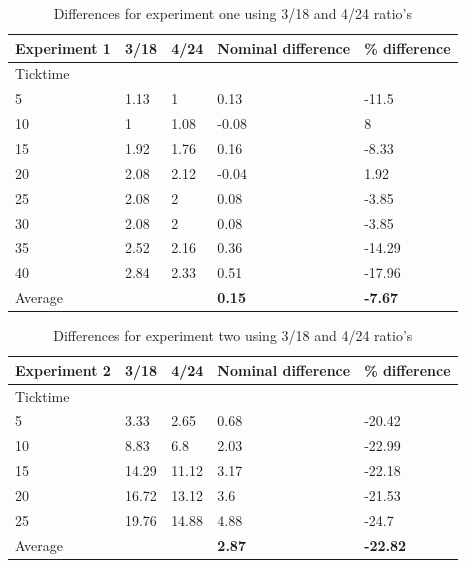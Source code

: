 \begin{table}[!htbp]
\begin{tabular}{| l | l | l | l | l |}
\hline
Experiment 1 & 3/18 & 4/24 & Nominal difference & \% difference \\ \hline
Ticktime &&&& \\ \hline
5 & 1.13 & 1 & 0.13 & -11.5 \\ \hline
10 & 1 & 1.08 & -0.08 & 8 \\ \hline
15 & 1.92 & 1.76 & 0.16 & -8.33 \\ \hline
20 & 2.08 & 2.12 & -0.04 & 1.92 \\ \hline
25 & 2.08 & 2 & 0.08 & -3.85 \\ \hline
30 & 2.08 & 2 & 0.08 & -3.85 \\ \hline
35 & 2.52 & 2.16 & 0.36 & -14.29 \\ \hline
40 & 2.84 & 2.33 & 0.51 & -17.96 \\ \hline \hline
Average &&& \textbf{0.15} & \textbf{-7.67} \\ \hline
\end{tabular}
\caption{Differences for experiment one using 3/18 and 4/24 ratio's}
\label{table:Diff34ex1}
\end{table}

\begin{table}[!htbp]
\begin{tabular}{| l | l | l | l | l |}
\hline
Experiment 2 & 3/18 & 4/24 & Nominal difference & \% difference \\ \hline
Ticktime &&&& \\ \hline
5 & 3.33 & 2.65 & 0.68 & -20.42 \\ \hline
10 & 8.83 & 6.8 & 2.03 & -22.99 \\ \hline
15 & 14.29 & 11.12 & 3.17 & -22.18 \\ \hline
20 & 16.72 & 13.12 & 3.6 & -21.53 \\ \hline
25 & 19.76 & 14.88 & 4.88 & -24.7 \\ \hline \hline
Average &&& \textbf{2.87} & \textbf{-22.82} \\ \hline
\end{tabular}
\caption{Differences for experiment two using 3/18 and 4/24 ratio's}
\label{table:Diff34ex2}
\end{table}

